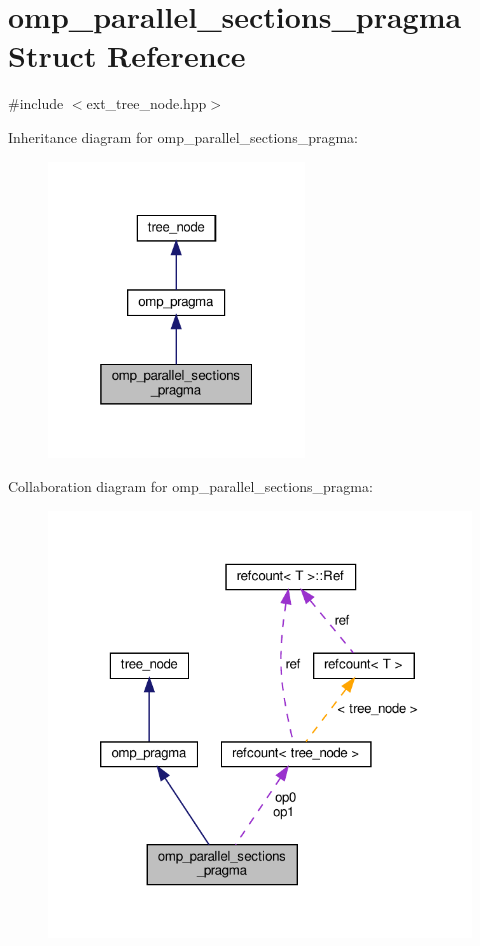 \hypertarget{structomp__parallel__sections__pragma}{}\section{omp\+\_\+parallel\+\_\+sections\+\_\+pragma Struct Reference}
\label{structomp__parallel__sections__pragma}


{\ttfamily \#include $<$ext\+\_\+tree\+\_\+node.\+hpp$>$}



Inheritance diagram for omp\+\_\+parallel\+\_\+sections\+\_\+pragma\+:
\nopagebreak
\begin{figure}[H]
\begin{center}
\leavevmode
\includegraphics[width=193pt]{d7/d6f/structomp__parallel__sections__pragma__inherit__graph}
\end{center}
\end{figure}


Collaboration diagram for omp\+\_\+parallel\+\_\+sections\+\_\+pragma\+:
\nopagebreak
\begin{figure}[H]
\begin{center}
\leavevmode
\includegraphics[width=320pt]{d5/dda/structomp__parallel__sections__pragma__coll__graph}
\end{center}
\end{figure}
